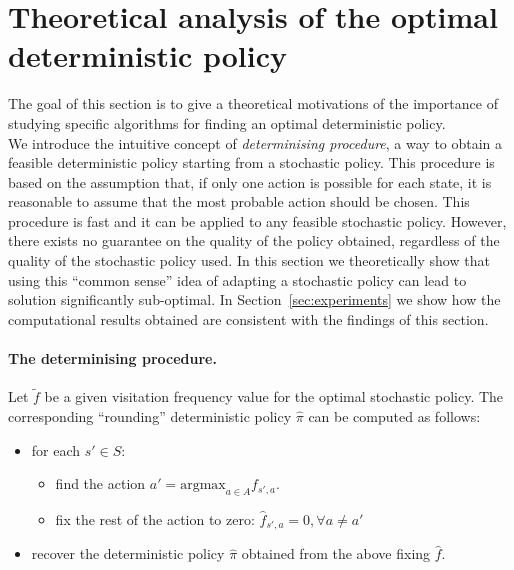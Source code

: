 \section{Theoretical analysis of the optimal deterministic policy}\label{sec:comparison}

%

The goal of this section is to give a theoretical motivations of the importance of studying specific algorithms for finding an optimal deterministic policy. \\
We introduce the intuitive concept of \emph{determinising procedure}, a way to obtain a feasible deterministic policy starting from a stochastic policy. This procedure is based on the assumption that, if only one action is possible for each state, it is reasonable to assume that the most probable action should be chosen. This procedure is fast and it can be applied to any feasible stochastic policy. However, there exists no guarantee on the quality of the policy obtained, regardless of the quality of the stochastic policy used. In this section we theoretically show that using this ``common sense'' idea of adapting a stochastic policy can lead to solution significantly sub-optimal. In Section~\ref{sec:experiments} we show how the computational results obtained are consistent with the findings of this section.

\paragraph{\textbf{The determinising procedure.}}%

Let $\tilde{f}$ be a given visitation frequency value for the optimal stochastic policy. The corresponding ``rounding'' deterministic policy $\hat{\pi}$ can be computed as follows:

\begin{itemize}
\item for each $s'\in S$:
\begin{itemize}
\item find the action $a' = \text{argmax}_{a \in A}f_{s',a}$.
\item fix the rest of the action to zero: $\hat{f}_{s',a} =0, \forall a \neq a'$
\end{itemize}
\item recover the deterministic policy $\hat{\pi}$ obtained from the above fixing $\hat{f}$.
\end{itemize} 
 
